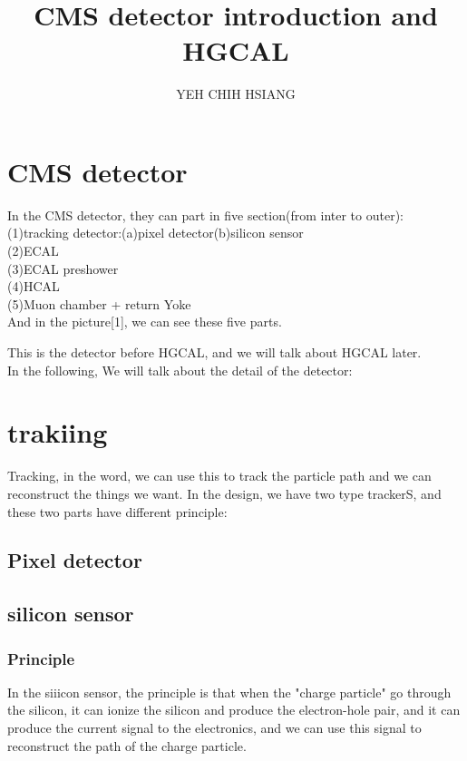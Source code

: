 \documentclass[12pt]{article}
\begin{document}
\title{CMS detector introduction and HGCAL}
\author{YEH CHIH HSIANG}
\maketitle

\section{CMS detector}
In the CMS detector, they can part in five section(from inter to outer):\\
(1)tracking detector:(a)pixel detector(b)silicon sensor\\
(2)ECAL\\
(3)ECAL preshower\\
(4)HCAL\\
(5)Muon chamber + return Yoke\\
And in the picture[1], we can see these five parts.

This is the detector before HGCAL, and we will talk about HGCAL later.\\

In the following, We will talk about the detail of the detector:
\section{trakiing}

Tracking, in the word, we can use this to track the particle path and we can reconstruct the things we want. In the design, we have two type trackerS, and these two parts have different principle:

\subsection{Pixel detector}



\subsection{silicon sensor}

\subsubsection{Principle}
In the siiicon sensor, the principle is that when the "charge particle" go through the silicon, it can ionize the silicon and produce the electron-hole pair, and it can produce the current signal to the electronics, and we can use this signal to reconstruct the path of the charge particle.
\end{document}
